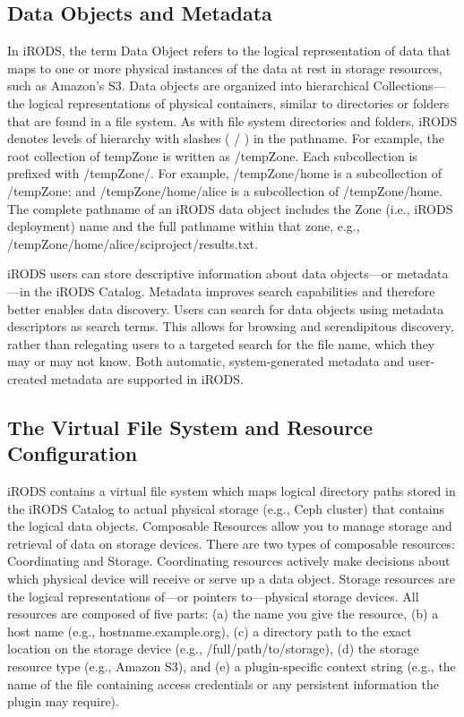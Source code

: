 \documentclass[10pt,oneside]{memoir}
\begin{document}
\subsection{Data Objects and Metadata}

In iRODS, the term Data Object refers to the logical representation of data that maps to one or more physical instances of the data at rest in storage resources, such as Amazon's S3. Data objects are organized into hierarchical Collections---the logical representations of physical containers, similar to directories or folders that are found in a file system. As with file system directories and folders, iRODS denotes levels of hierarchy with slashes ( / ) in the pathname. For example, the root collection of tempZone is written as /tempZone. Each subcollection is prefixed with /tempZone/.  For example, /tempZone/home is a subcollection of /tempZone; and /tempZone/home/alice is a subcollection of /tempZone/home. The complete pathname of an iRODS data object includes the Zone (i.e., iRODS deployment) name and the full pathname within that zone, e.g., /tempZone/home/alice/sciproject/results.txt.

iRODS users can store descriptive information about data objects---or metadata---in the iRODS Catalog. Metadata improves search capabilities and therefore better enables data discovery. Users can search for data objects using metadata descriptors as search terms.  This allows for browsing and serendipitous discovery, rather than relegating users to a targeted search for the file name, which they may or may not know. Both automatic, system-generated metadata and user-created metadata are supported in iRODS.

\subsection{The Virtual File System and Resource Configuration}

iRODS contains a virtual file system which maps logical directory paths stored in the iRODS Catalog to actual physical storage (e.g., Ceph cluster) that contains the logical data objects. Composable Resources allow you to manage storage and retrieval of data on storage devices. There are two types of composable resources: Coordinating and Storage. Coordinating resources actively make decisions about which physical device will receive or serve up a data object. Storage resources are the logical representations of---or pointers to---physical storage devices. All resources are composed of five parts: (a) the name you give the resource, (b) a host name (e.g., hostname.example.org), (c) a directory path to the exact location on the storage device (e.g., /full/path/to/storage), (d) the storage resource type (e.g., Amazon S3), and (e) a plugin-specific context string (e.g., the name of the file containing access credentials or any persistent information the plugin may require).
\end{document}
